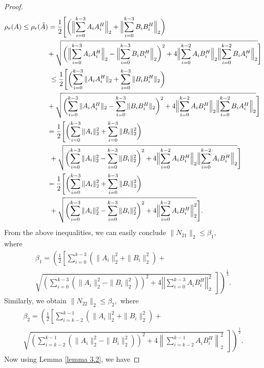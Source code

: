 \documentclass [12pt]{article}
\begin{document}
\begin{proof}
\begin{align*}
\rho_{r}(A) &\le \rho_{r}(\tilde{A}) 
= \frac{1}{2}\Biggl[ \biggl( \Bigl\|\sum_{i=0}^{k-3} A_i A_i^{H}\Bigr\|_2 + \Bigl\|\sum_{i=0}^{k-3} B_i B_i^{H}\Bigr\|_2 \biggr) \\
&~~~~~\qquad + \sqrt{ \biggl( \Bigl\|\sum_{i=0}^{k-3} A_i A_i^{H}\Bigr\|_2 - \Bigl\|\sum_{i=0}^{k-3} B_i B_i^{H}\Bigr\|_2 \biggr)^2 + 4\Bigl\|\sum_{i=0}^{k-2} A_i B_i^{H}\Bigr\|_2 \Bigl\|\sum_{i=0}^{k-2} B_i A_i^{H}\Bigr\|_2 } \Biggr] \\
&~~~~~~~~~~~~\le \frac{1}{2}\Biggl[ \biggl( \sum_{i=0}^{k-3} \|A_i A_i^{H}\|_2 + \sum_{i=0}^{k-3} \|B_i B_i^{H}\|_2 \biggr) \\
&~~~~~\qquad + \sqrt{ \biggl( \sum_{i=0}^{k-3} \|A_i A_i^{H}\|_2 - \sum_{i=0}^{k-3} \|B_i B_i^{H}\|_2 \biggr)^2 + 4\Bigl\|\sum_{i=0}^{k-2} A_i B_i^{H}\Bigr\|_2 \Bigl\|\sum_{i=0}^{k-2} B_i A_i^{H}\Bigr\|_2 } \Biggr] \\
&~~~~~~~~~~~= \frac{1}{2}\Biggl[ \biggl( \sum_{i=0}^{k-3} \|A_i\|_2^2 + \sum_{i=0}^{k-3} \|B_i\|_2^2 \biggr) \\
&~~~~~~\qquad + \sqrt{ \biggl( \sum_{i=0}^{k-3} \|A_i\|_2^2 - \sum_{i=0}^{k-3} \|B_i\|_2^2 \biggr)^2 + 4\Bigl\|\sum_{i=0}^{k-2} A_i B_i^{H}\Bigr\|_2 \Bigl\|\sum_{i=0}^{k-2} A_i B_i^{H}\Bigr\|_2 } \Biggr] \\
&~~~~~~~~~~~= \frac{1}{2}\Biggl[ \biggl( \sum_{i=0}^{k-3} \|A_i\|_2^2 + \sum_{i=0}^{k-3} \|B_i\|_2^2 \biggr) \\
&~~~~~~\qquad + \sqrt{ \biggl( \sum_{i=0}^{k-3} \|A_i\|_2^2 - \sum_{i=0}^{k-3} \|B_i\|_2^2 \biggr)^2 + 4\Bigl\|\sum_{i=0}^{k-2} A_i B_i^{H}\Bigr\|_2^2 } \Biggr].
\end{align*}
 From the above inequalities, we can easily conclude 
     $\|N_{21}\|_{2}\le \beta_{1},$ \\
where  \begin{multline*}
 \beta_{1}=\left( \frac{1}{2} \left[ \sum_{i=0}^{k-3}\left(\|A_{i}\|^{2}_{2}+\|B_{i}\|_{2}^{2}\right)+ \right. \right. \\
\left. \left.\sqrt{ \left( \sum_{i=0}^{k-3}\left(\|A_{i}\|^{2}_{2}-\|B_{i}\|_{2}^{2} \right)     \right)^{2}            +4\left|\left|\sum_{i=0}^{k-3}A_{i}{B_{i}^{H}}\right|\right|_{2}^{2} }~~\right]  \right)^{\frac{1}{2}}.
\end{multline*}
Similarly, we obtain $\|N_{22}\|_{2}\le \beta_{2},$ where
\begin{multline*} 
\beta_{2}=\left( \frac{1}{2} \left[ \sum_{i=k-2}^{k-1}\left(\|A_{i}\|^{2}_{2}+\|B_{i}\|_{2}^{2}\right)+ \right. \right. \\
\left. \left. \sqrt{ \left( \sum_{i=k-2}^{k-1}\left(\|A_{i}\|^{2}_{2}-\|B_{i}\|_{2}^{2} \right) \right)^{2} +4\left\|\sum_{i=k-2}^{k-1}A_{i}{B_{i}^{H}}\right\|_{2}^{2} }~~\right] \right)^{\frac{1}{2}}. 
\end{multline*}
Now using Lemma {\ref{lemma 3.2}}, we have 


\end{proof}
\end{document}
